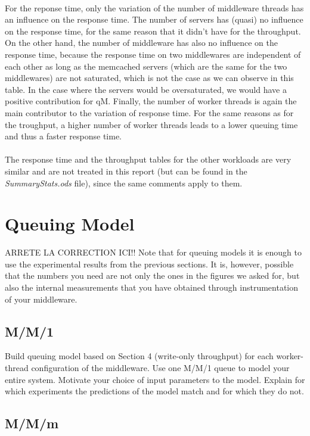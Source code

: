 \documentclass[11pt,a4paper]{article}
\begin{document}
\\
For the reponse time, only the variation of the number of middleware threads has an influence on the response time. The number of servers has (quasi) no influence on the response time, for the same reason that it didn't have for the throughput. On the other hand, the number of middleware has also no influence on the response time, because the response time on two middlewares are independent of each other as long as the memcached servers (which are the same for the two middlewares) are not saturated, which is not the case as we can observe in this table. In the case where the servers would be oversaturated, we would have a positive contribution for qM. 
Finally, the number of worker threads is again the main contributor to the variation of response time. For the same reasons as for the troughput, a higher number of worker threads leads to a lower queuing time and thus a faster response time. 
\\\\
The response time and the throughput tables for the other workloads are very similar and are not treated in this report (but can be found in the \textit{SummaryStats.ods} file), since the same comments apply to them. 
\newpage
\section{Queuing Model}
ARRETE LA CORRECTION ICI!!
Note that for queuing models it is enough to use the experimental results from the previous sections. It is, however, possible that the numbers you need are not only the ones in the figures we asked for, but also the internal measurements that you have obtained through instrumentation of your middleware.

\subsection{M/M/1}

Build queuing model based on Section 4 (write-only throughput) for each worker-thread configuration of the middleware. Use one M/M/1 queue to model your entire system. Motivate your choice of input parameters to the model. Explain for which experiments the predictions of the model match and for which they do not.

\subsection{M/M/m}
\end{document}
